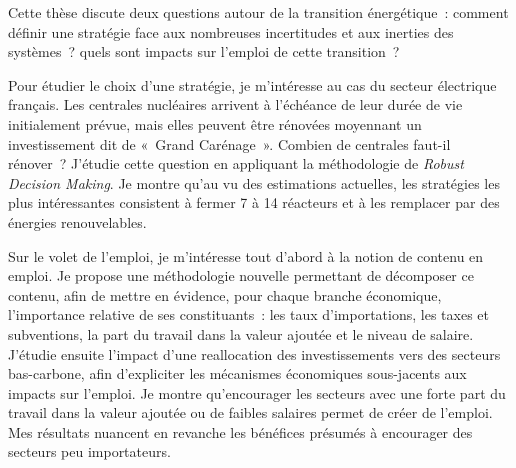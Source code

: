 Cette thèse discute deux questions autour de la transition énergétique : comment définir une stratégie face aux nombreuses incertitudes et aux inerties des systèmes ? quels sont impacts sur l’emploi de cette transition ?

Pour étudier le choix d’une stratégie, je m’intéresse au cas du secteur électrique français. Les centrales nucléaires arrivent à l’échéance de leur durée de vie initialement prévue, mais elles peuvent être rénovées moyennant un investissement dit de « Grand Carénage ». Combien de centrales faut-il rénover ? J’étudie cette question en appliquant la méthodologie de \textit{Robust Decision Making}. Je montre qu’au vu des estimations actuelles, les stratégies les plus intéressantes consistent à fermer 7 à 14 réacteurs et à les remplacer par des énergies renouvelables.

Sur le volet de l’emploi, je m’intéresse tout d’abord à la notion de contenu en emploi. Je propose une méthodologie nouvelle permettant de décomposer ce contenu, afin de mettre en évidence, pour chaque branche économique, l’importance relative de ses constituants : les taux d’importations, les taxes et subventions, la part du travail dans la valeur ajoutée et le niveau de salaire. 
J'étudie ensuite l’impact d’une reallocation des investissements vers des secteurs bas-carbone, afin d'expliciter les mécanismes économiques sous-jacents aux impacts sur l'emploi. 
Je montre qu'encourager les secteurs avec une forte part du travail dans la valeur ajoutée ou de faibles salaires permet de créer de l'emploi. Mes résultats nuancent en revanche les bénéfices présumés à encourager des secteurs peu importateurs.


